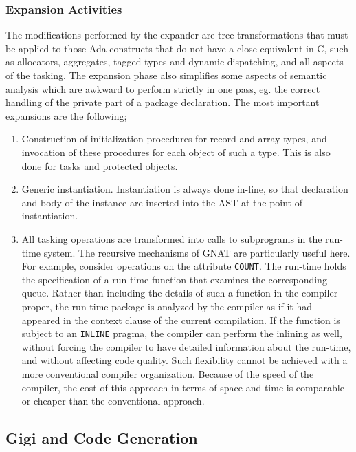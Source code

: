 \subsubsection{Expansion Activities}

The modifications performed by the expander are tree transformations that must 
be applied to those Ada constructs that do not have a close equivalent in C, 
such as allocators, aggregates, tagged types and dynamic dispatching,  
and all aspects of the tasking. The expansion phase also simplifies  some
aspects of semantic analysis which are awkward to perform strictly in  one
pass, eg. the correct handling of the private part of a package declaration.
The most important expansions are the following; 

\begin{enumerate}

\item Construction of initialization procedures for record and array types,
and invocation of these procedures for each object of such a type. This is
also done for tasks and protected objects.

\item Generic instantiation. Instantiation is always done in-line, so that
declaration and body of the instance are inserted into the AST at the point
of instantiation.

\item All tasking operations are transformed into calls to subprograms in
the run-time system. The recursive mechanisms of GNAT are particularly useful
here. For example,  consider operations on the attribute {\tt COUNT}. The
run-time holds the specification of a run-time function that examines the
corresponding queue. Rather than including the details of such a function
in the compiler proper, the run-time package is analyzed by the compiler as
if it had appeared in the context clause of the current compilation.  If the
function is subject to an {\tt INLINE} pragma, the compiler can perform the
inlining as well, without forcing the compiler to have detailed information
about the run-time, and without affecting code quality. Such flexibility
cannot be achieved with a more conventional compiler organization. Because
of the speed of the compiler,  the cost of this approach in terms of space
and time is comparable or cheaper than the conventional approach. 

\end{enumerate}


\subsection{Gigi and Code Generation}

